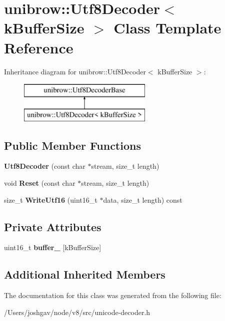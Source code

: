 \hypertarget{classunibrow_1_1_utf8_decoder}{}\section{unibrow\+:\+:Utf8\+Decoder$<$ k\+Buffer\+Size $>$ Class Template Reference}
\label{classunibrow_1_1_utf8_decoder}
Inheritance diagram for unibrow\+:\+:Utf8\+Decoder$<$ k\+Buffer\+Size $>$\+:\begin{figure}[H]
\begin{center}
\leavevmode
\includegraphics[height=2.000000cm]{classunibrow_1_1_utf8_decoder}
\end{center}
\end{figure}
\subsection*{Public Member Functions}
\begin{DoxyCompactItemize}
\item 
{\bfseries Utf8\+Decoder} (const char $\ast$stream, size\+\_\+t length)\hypertarget{classunibrow_1_1_utf8_decoder_acb73e72b9769d63f5924f6bb98d8bd52}{}\label{classunibrow_1_1_utf8_decoder_acb73e72b9769d63f5924f6bb98d8bd52}

\item 
void {\bfseries Reset} (const char $\ast$stream, size\+\_\+t length)\hypertarget{classunibrow_1_1_utf8_decoder_ae35b8ed639c5d096562c0c494626b041}{}\label{classunibrow_1_1_utf8_decoder_ae35b8ed639c5d096562c0c494626b041}

\item 
size\+\_\+t {\bfseries Write\+Utf16} (uint16\+\_\+t $\ast$data, size\+\_\+t length) const \hypertarget{classunibrow_1_1_utf8_decoder_aaa12c30b7dbddcecd7b2ed9b98007f49}{}\label{classunibrow_1_1_utf8_decoder_aaa12c30b7dbddcecd7b2ed9b98007f49}

\end{DoxyCompactItemize}
\subsection*{Private Attributes}
\begin{DoxyCompactItemize}
\item 
uint16\+\_\+t {\bfseries buffer\+\_\+} \mbox{[}k\+Buffer\+Size\mbox{]}\hypertarget{classunibrow_1_1_utf8_decoder_a69f89baadbd689d9847ed2e9b7eeef80}{}\label{classunibrow_1_1_utf8_decoder_a69f89baadbd689d9847ed2e9b7eeef80}

\end{DoxyCompactItemize}
\subsection*{Additional Inherited Members}


The documentation for this class was generated from the following file\+:\begin{DoxyCompactItemize}
\item 
/\+Users/joshgav/node/v8/src/unicode-\/decoder.\+h\end{DoxyCompactItemize}
